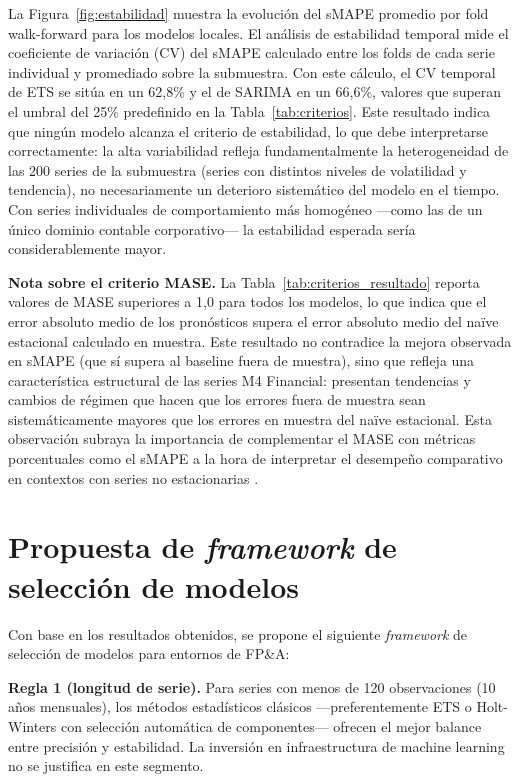 La Figura~\ref{fig:estabilidad} muestra la evolución del sMAPE promedio por fold walk-forward para los modelos locales. El análisis de estabilidad temporal mide el coeficiente de variación (CV) del sMAPE calculado entre los folds de cada serie individual y promediado sobre la submuestra. Con este cálculo, el CV temporal de ETS se sitúa en un 62,8\% y el de SARIMA en un 66,6\%, valores que superan el umbral del 25\% predefinido en la Tabla~\ref{tab:criterios}. Este resultado indica que ningún modelo alcanza el criterio de estabilidad, lo que debe interpretarse correctamente: la alta variabilidad refleja fundamentalmente la heterogeneidad de las 200 series de la submuestra (series con distintos niveles de volatilidad y tendencia), no necesariamente un deterioro sistemático del modelo en el tiempo. Con series individuales de comportamiento más homogéneo ---como las de un único dominio contable corporativo--- la estabilidad esperada sería considerablemente mayor.

\textbf{Nota sobre el criterio MASE.} La Tabla~\ref{tab:criterios_resultado} reporta valores de MASE superiores a 1{,}0 para todos los modelos, lo que indica que el error absoluto medio de los pronósticos supera el error absoluto medio del naïve estacional calculado en muestra. Este resultado no contradice la mejora observada en sMAPE (que sí supera al baseline fuera de muestra), sino que refleja una característica estructural de las series M4 Financial: presentan tendencias y cambios de régimen que hacen que los errores fuera de muestra sean sistemáticamente mayores que los errores en muestra del naïve estacional. Esta observación subraya la importancia de complementar el MASE con métricas porcentuales como el sMAPE a la hora de interpretar el desempeño comparativo en contextos con series no estacionarias \parencite{Hyndman2021}.

\section{Propuesta de \textit{framework} de selección de modelos}
\label{sec:framework_seleccion}

Con base en los resultados obtenidos, se propone el siguiente \textit{framework} de selección de modelos para entornos de FP\&A:

\textbf{Regla 1 (longitud de serie).} Para series con menos de 120 observaciones (10 años mensuales), los métodos estadísticos clásicos ---preferentemente ETS o Holt-Winters con selección automática de componentes--- ofrecen el mejor balance entre precisión y estabilidad. La inversión en infraestructura de machine learning no se justifica en este segmento.

